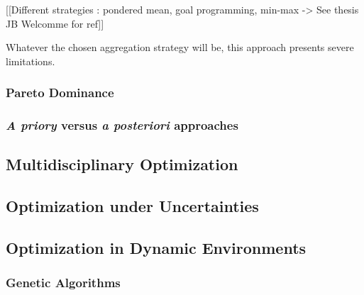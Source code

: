 [[Different strategies : pondered mean, goal programming, min-max -> See thesis JB Welcomme for ref]]

Whatever the chosen aggregation strategy will be, this approach presents severe limitations. 

\subsubsection{Pareto Dominance}

\subsubsection{\emph{A priory} versus \emph{a posteriori} approaches}

\subsection{Multidisciplinary Optimization}

\subsection{Optimization under Uncertainties}

\subsection{Optimization in Dynamic Environments}

\subsubsection{Genetic Algorithms}



